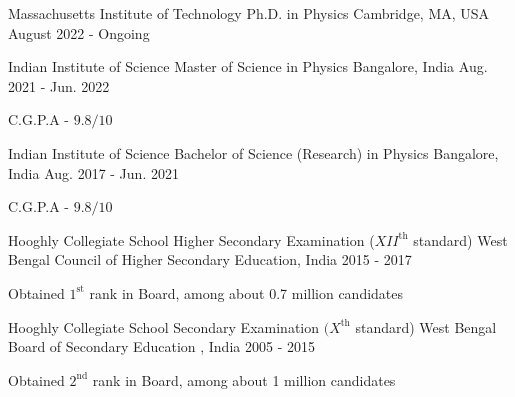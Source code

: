 

\begin{cventries}

    \cventry
	{Massachusetts Institute of Technology} %
	{Ph.D. in Physics} %
	{Cambridge, MA, USA} %
	{August 2022 - Ongoing} %
	{
	}

    \cventry
	{Indian Institute of Science} %
	{Master of Science in Physics} %
	{Bangalore, India} %
	{Aug. 2021 - Jun. 2022} %
	{
	\begin{cvitems} %
		\item {C.G.P.A - $9.8/10$}
	\end{cvitems}
	}

  \cventry
    {Indian Institute of Science} %
    {Bachelor of Science (Research) in Physics} %
    {Bangalore, India} %
    {Aug. 2017 - Jun. 2021} %
    {
      \begin{cvitems} %
        \item {C.G.P.A - $9.8/10$}
      \end{cvitems}
    }

  \cventry
	{Hooghly Collegiate School} %
	{Higher Secondary Examination ($XII^{\text{th}}$ standard)} %
	{West Bengal Council of Higher Secondary Education, India} %
	{2015 - 2017} %
	{
	\begin{cvitems} %
		\item {Obtained $1^{\text{st}}$ rank in Board, among about 0.7 million candidates}
	\end{cvitems}
	}

  \cventry
	{Hooghly Collegiate School} %
	{Secondary Examination $(X^{\text{th}}$ standard)} %
	{West Bengal Board of Secondary Education , India} %
	{2005 - 2015} %
	{
	\begin{cvitems} %
		\item {Obtained $2^{\text{nd}}$ rank in Board, among about 1 million candidates}
	\end{cvitems}
	}


\end{cventries}
